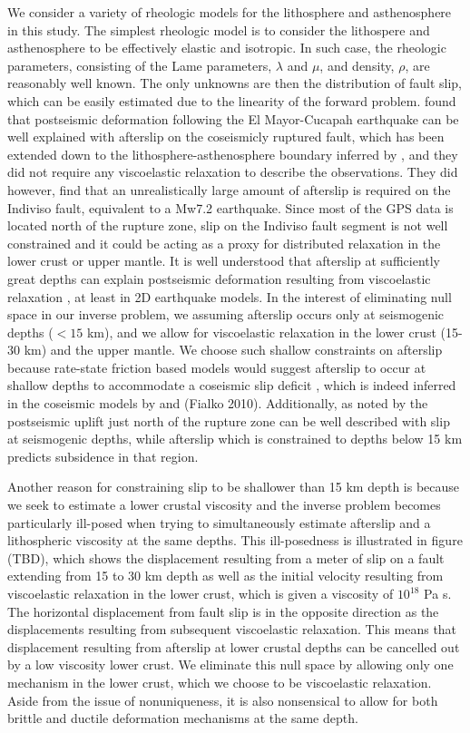 \documentclass[12pt]{article}
\begin{document}
We consider a variety of rheologic models for the lithosphere and asthenosphere in this study.  The simplest rheologic model is to consider the lithospere and asthenosphere to be effectively elastic and isotropic.  In such case, the rheologic parameters, consisting of the Lame parameters, $\lambda$ and $\mu$, and density, $\rho$, are reasonably well known. The only unknowns are then the distribution of fault slip, which can be easily estimated due to the linearity of the forward problem.  \cite{Rollins2015} found that postseismic deformation following the El Mayor-Cucapah earthquake can be well explained with afterslip on the coseismicly ruptured fault, which has been extended down to the lithosphere-asthenosphere boundary inferred by \cite{Lekic2011}, and they did not require any viscoelastic relaxation to describe the observations.  They did however, find that an unrealistically large amount of afterslip is required on the Indiviso fault, equivalent to a Mw7.2 earthquake.  Since most of the GPS data is located north of the rupture zone, slip on the Indiviso fault segment is not well constrained and it could be acting as a proxy for distributed relaxation in the lower crust or upper mantle.  It is well understood that afterslip at sufficiently great depths can explain postseismic deformation resulting from viscoelastic relaxation \cite{Savage1990}, at least in 2D earthquake models.  In the interest of eliminating null space in our inverse problem,  we assuming afterslip occurs only at seismogenic depths ($<15$ km), and we allow for viscoelastic relaxation in the lower crust (15-30 km) and the upper mantle.  We choose such shallow constraints on afterslip because rate-state friction based models would suggest afterslip to occur at shallow depths to accommodate a coseismic slip deficit \cite{Marone1991}, which is indeed inferred in the coseismic models by \cite{Wei2011a} and (Fialko 2010).  Additionally, as noted by \cite{Rollins2015} the postseismic uplift just north of the rupture zone can be well described with slip at seismogenic depths, while afterslip which is constrained to depths below 15 km predicts subsidence in that region.  

Another reason for constraining slip to be shallower than 15 km depth is because we seek to estimate a lower crustal viscosity and the inverse problem becomes particularly ill-posed when trying to simultaneously estimate afterslip and a lithospheric viscosity at the same depths. 
This ill-posedness is illustrated in figure (TBD), which shows the displacement resulting from a meter of slip on a fault extending from 15 to 30 km depth as well as the initial velocity resulting from viscoelastic relaxation in the lower crust, which is given a viscosity of $10^{18}$ Pa s.  The horizontal displacement from fault slip is in the opposite direction as the displacements resulting from subsequent viscoelastic relaxation.  This means that displacement resulting from afterslip at lower crustal depths can be cancelled out by a low viscosity lower crust.  We eliminate this null space by allowing only one mechanism in the lower crust, which we choose to be viscoelastic relaxation.  Aside from the issue of nonuniqueness, it is also nonsensical to allow for both brittle and ductile deformation mechanisms at the same depth. 
\end{document}
